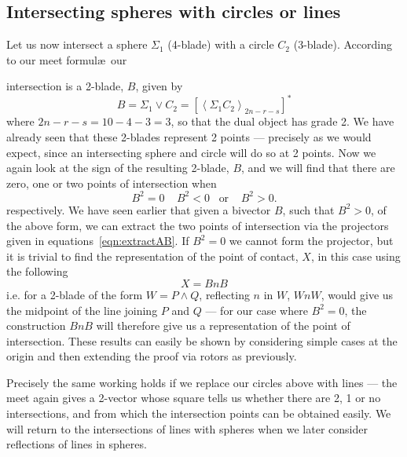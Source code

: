 
\subsection{Intersecting spheres with circles or lines}

Let us now intersect a sphere $\Sigma_1$ (4-blade) with a
circle $C_2$ (3-blade). According to our meet formul\ae\ our

intersection is a 2-blade, $B$, given by
%
\begin{equation}
B = \Sigma_1 \vee C_2 = \left[\left< \Sigma_1 C_2
\right>_{2n-r-s}\right]^*
\end{equation}
%
where $2n-r-s=10-4-3=3$, so that the dual object has
grade 2. We have already seen that these 2-blades
represent 2 points --- precisely as we would expect, since
an intersecting sphere and circle will do so at 2 points.
Now we again look at the sign of the resulting 2-blade,
$B$, and we will find that there are zero, one or two
points of intersection when
%
\[  B^2=0 \;\;\;\; B^2<0 \;\;\;\mbox{or}\;\;\;\; B^2>0.
\]
%
respectively.
We have seen earlier that given a bivector $B$, such that
$B^2>0$, of the above form, we can extract the two points
of intersection via the projectors given in
equations~\ref{eqn:extractAB}. If $B^2=0$ we cannot form
the projector, but it is trivial to find the representation of the point of
contact, $X$, in this case using the following
%
\[  X = BnB  \]
%
i.e. for a 2-blade of the form $W = P\wedge Q$, reflecting
$n$ in $W$, $WnW$, would give us the midpoint of the line
joining $P$ and $Q$ --- for our case where $B^2=0$, the
construction $BnB$ will therefore give us a representation of the point of
intersection. These results can easily be shown by
considering simple cases at the origin and then extending
the proof via rotors as previously.

Precisely the same working holds if we replace our
circles above with lines --- the meet again gives a
2-vector whose square tells us whether there are 2, 1 or
no intersections, and from which the intersection points
can be obtained easily. We will return to the
intersections of lines with spheres when we later
consider reflections of lines in spheres.





